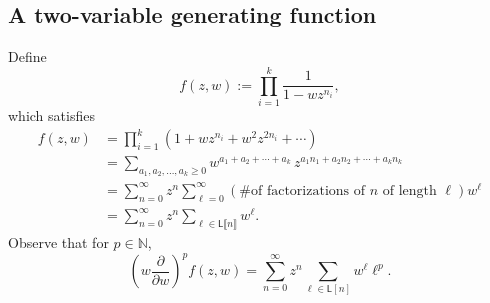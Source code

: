 \documentclass[10pt,reqno]{amsart}
\newcommand{\NN}{\mathbb{N}}
\newcommand{\Le}{\mathsf{L}}
\providecommand{\multi}[1]{\llbracket #1 \rrbracket}
\newcommand{\0}{\color{lightgray}0}
\renewcommand\>{\rangle}
\newcommand\<{\langle}
\theoremstyle{plain}
\theoremstyle{definition}
\begin{document}
\subsection{A two-variable generating function}\label{subsection:generating}
Define
\begin{equation*}
f(z,w) := \prod_{i=1}^k \frac{1}{1 - wz^{n_i}},
\end{equation*}
which satisfies
\begin{align}
f(z,w)
&= \prod_{i=1}^k (1 + wz^{n_i} + w^2z^{2n_i} + \cdots) \nonumber \\
&= \sum_{a_1,a_2,\ldots,a_k \geq 0} w^{a_1 + a_2 + \cdots + a_k}\, z^{a_1 n_1 + a_2 n_2 + \cdots + a_k n_k} \nonumber \\
&= \sum_{n=0}^\infty z^n \sum_{\ell=0}^\infty (\text{\# of factorizations of $n$ of length $\ell$}) w^{\ell} \nonumber \\  
&= \sum_{n=0}^\infty z^n \sum_{\ell \in \Le\multi{n}} w^{\ell}. \nonumber
\end{align}
Observe that for $p\in \NN$, 
\begin{equation}\label{eq:fuzz}
\left( \! w \frac{\partial}{\partial w} \! \right)^{\!\!p} \!\! f(z,w) 
=\sum_{n=0}^\infty z^n \sum_{\ell \in \Le[n]}  w^{\ell} \ell^p.
\end{equation}

\end{document}
